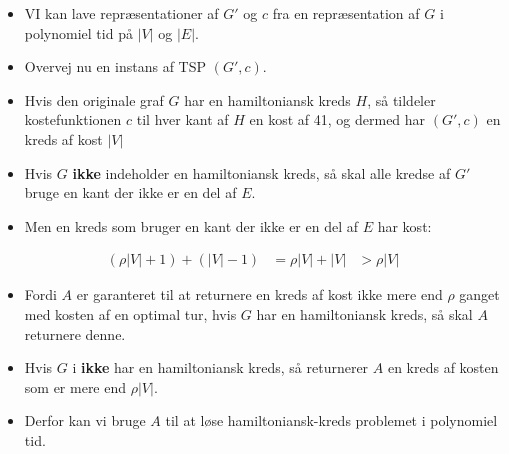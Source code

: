 \begin{frame}[allowframebreaks]
\begin{itemize}
		\item VI kan lave repræsentationer af $G'$ og $c$ fra en repræsentation af $G$ i polynomiel tid på $|V|$ og $|E|$.
		\item Overvej nu en instans af TSP $(G', c)$.
		\item Hvis den originale graf $G$ har en hamiltoniansk kreds $H$, så tildeler kostefunktionen $c$ til hver kant af $H$ en kost af 41, og dermed har $(G', c)$ en kreds af kost $|V|$
		\item Hvis $G$ \textbf{ikke} indeholder en hamiltoniansk kreds, så skal alle kredse af $G'$ bruge en kant der ikke er en del af $E$.
		\item Men en kreds som bruger en kant der ikke er en del af $E$ har kost:
	\end{itemize}
	\begin{align}
		(\rho|V| +1) + (|V|-1) & = \rho|V|+|V|
		                       & > \rho|V|
	\end{align}
	\begin{itemize}
		\item Fordi $A$ er garanteret til at returnere en kreds af kost ikke mere end $\rho$ ganget med kosten af en optimal tur, hvis $G$ har en hamiltoniansk kreds, så skal $A$ returnere denne.
		\item Hvis $G$ i \textbf{ikke} har en hamiltoniansk kreds, så returnerer $A$ en kreds af kosten som er mere end \(\rho|V|\).
		\item Derfor kan vi bruge $A$ til at løse hamiltoniansk-kreds problemet i polynomiel tid.
	\end{itemize}
\end{frame}



